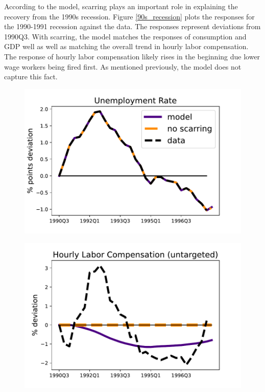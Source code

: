 According to the model, scarring plays an important role in explaining the recovery from the 1990s recession. Figure \ref{90s_recession} plots the responses for the 1990-1991 recession against the data. The responses represent deviations from 1990Q3. With scarring, the model matches the responses of consumption and GDP well as well as matching the overall trend in hourly labor compensation. The response of hourly labor compensation likely rises in the beginning due lower wage workers being fired first. As mentioned previously, the model does not capture this fact.




\begin{figure}[H] %
\centering
\begin{minipage}{0.51\textwidth}
\includegraphics[scale=.57]{text/Chapter1/Figures/90s/Urate_90s}
 \label{fig:a}
\end{minipage}\hspace*{\fill}
\begin{minipage}{0.51\textwidth}
\includegraphics[scale=.57]{text/Chapter1/Figures/90s/hourly_comp_83Q1}
 \label{fig:b}
\end{minipage}


\end{figure}
